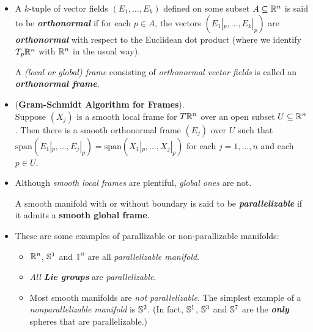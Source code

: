 \documentclass[11pt]{article}
\begin{document}
\begin{itemize}
\item \begin{definition}
A $k$-tuple of vector fields $(E_1,\ldots,E_k)$ defined on some subset $A \subseteq {\mathbb R}^n$ is said to be \emph{\textbf{orthonormal}} if for each $p \in A$, the vectors $(E_1|_{p},\ldots,E_k|_{p})$ are \emph{\textbf{orthonormal}} with respect to the Euclidean dot product (where we identify $T_{p}{\mathbb R}^n$ with ${\mathbb R}^n$ in the usual way). 

A \emph{(local or global) frame} consisting of \emph{orthonormal vector fields} is called an \emph{\textbf{orthonormal frame}}.
\end{definition}

\item \begin{lemma}\label{lemma: gram_schmidt} (\textbf{Gram-Schmidt Algorithm for Frames}). \\
Suppose $(X_j)$ is a smooth local frame for $T {\mathbb R}^n$ over an open subset $U \subseteq {\mathbb R}^n$. Then there is a smooth orthonormal frame $(E_j)$ over $U$ such that $\text{span}(E_1|_{p},\ldots, E_j|_{p}) = \text{span}(X_1|_{p},\ldots, X_j|_{p})$ for each $j = 1,\ldots,n$ and each $p \in U$.
\end{lemma}

\item Although \emph{smooth local frames} are plentiful, \emph{global ones} are not.
\begin{definition}
A smooth manifold with or without boundary is said to be \emph{\textbf{parallelizable}} if it admits a \textbf{smooth global frame}.
\end{definition}

\item 
\begin{example} These are some examples of parallizable or non-parallizable manifolds:
\begin{itemize}
\item ${\mathbb R}^{n}$, ${\mathbb S}^{1}$ and $\mathbb{T}^{n}$ are all \emph{parallelizable manifold}.
\item \emph{All \textbf{Lie groups}} are \emph{parallelizable}.
\item Most smooth manifolds are \emph{not parallelizable}. The simplest example of a \emph{nonparallelizable manifold} is ${\mathbb S}^2$. (In fact, ${\mathbb S}^{1}$, ${\mathbb S}^{3}$ and ${\mathbb S}^{7}$ are the \emph{\textbf{only}} spheres that are parallelizable.)
\end{itemize}
\end{example}
\end{itemize}
\end{document}
